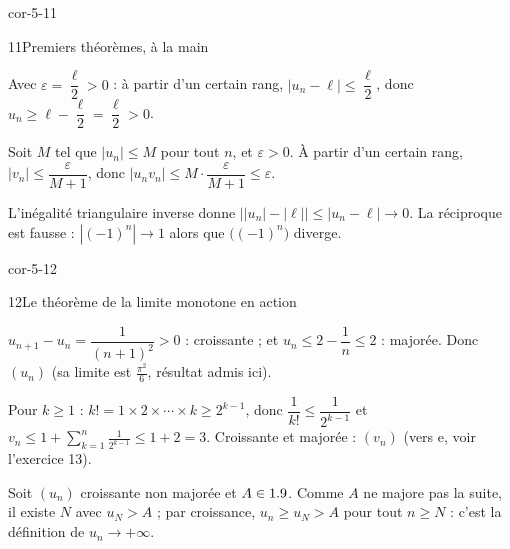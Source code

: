 \begin{blocLivre}{cor-5-11}
\begin{corrige}{11}{Premiers théorèmes, à la main}
\begin{questions}
  \item Avec $\varepsilon=\dfrac{\ell}{2}>0$ : à partir d'un certain rang,
    $|u_n-\ell|\leq\dfrac{\ell}{2}$, donc
    $u_n\geq\ell-\dfrac{\ell}{2}=\dfrac{\ell}{2}>0$.
  \item Soit $M$ tel que $|u_n|\leq M$ pour tout $n$, et $\varepsilon>0$.
    À partir d'un certain rang, $|v_n|\leq\dfrac{\varepsilon}{M+1}$, donc
    $|u_nv_n|\leq M\cdot\dfrac{\varepsilon}{M+1}\leq\varepsilon$.
  \item L'inégalité triangulaire inverse donne
    $\bigl||u_n|-|\ell|\bigr|\leq|u_n-\ell|\to0$. La réciproque est fausse :
    $|(-1)^{n}|\to1$ alors que $\bigl((-1)^{n}\bigr)$ diverge.
\end{questions}
\end{corrige}
\end{blocLivre}

\begin{blocLivre}{cor-5-12}
\begin{corrige}{12}{Le théorème de la limite monotone en action}
\begin{questions}
  \item $u_{n+1}-u_n=\dfrac{1}{(n+1)^{2}}>0$ : croissante ; et
    $u_n\leq2-\dfrac1n\leq2$ : majorée. Donc $(u_n)$ 
    (sa limite est $\frac{\pi^{2}}{6}$, résultat admis ici).
  \item Pour $k\geq1$ : $k!=1\times2\times\cdots\times k\geq2^{k-1}$, donc
    $\dfrac{1}{k!}\leq\dfrac{1}{2^{k-1}}$ et
    $v_n\leq1+\displaystyle\sum_{k=1}^{n}\frac{1}{2^{k-1}}\leq1+2=3$. Croissante et
    majorée : $(v_n)$  (vers $\mathrm{e}$, voir
    l'exercice 13).
  \item Soit $(u_n)$ croissante non majorée et $A\in1.9$. Comme $A$ ne majore
    pas la suite, il existe $N$ avec $u_N>A$ ; par croissance, $u_n\geq u_N>A$
    pour tout $n\geq N$ : c'est la définition de $u_n\to+\infty$.
\end{questions}
\end{corrige}
\end{blocLivre}


